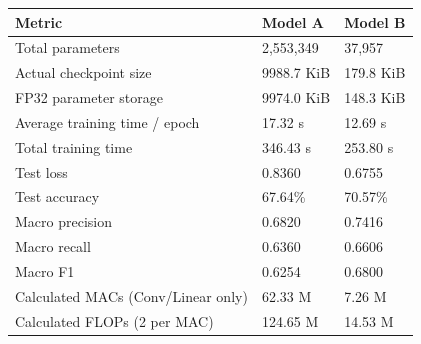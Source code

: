 \begin{tabular}{lll}
\toprule
Metric & Model A & Model B \\
\midrule
Total parameters & 2,553,349 & 37,957 \\
Actual checkpoint size & 9988.7 KiB & 179.8 KiB \\
FP32 parameter storage & 9974.0 KiB & 148.3 KiB \\
Average training time / epoch & 17.32 s & 12.69 s \\
Total training time & 346.43 s & 253.80 s \\
Test loss & 0.8360 & 0.6755 \\
Test accuracy & 67.64\% & 70.57\% \\
Macro precision & 0.6820 & 0.7416 \\
Macro recall & 0.6360 & 0.6606 \\
Macro F1 & 0.6254 & 0.6800 \\
Calculated MACs (Conv/Linear only) & 62.33 M & 7.26 M \\
Calculated FLOPs (2 per MAC) & 124.65 M & 14.53 M \\
\bottomrule
\end{tabular}
